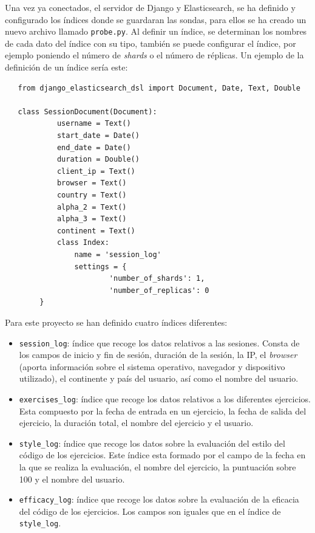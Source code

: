   Una vez ya conectados, el servidor de Django y Elasticsearch, se ha definido y configurado los índices donde se guardaran las sondas, para ellos se ha creado un nuevo archivo llamado \texttt{probe.py}. Al definir un índice, se determinan los nombres de cada dato del índice con su tipo, también se puede configurar el índice, por ejemplo poniendo el número de\textit{ shards }o el número de réplicas. Un ejemplo de la definición de un índice sería este: \\

\begin{lstlisting}
   from django_elasticsearch_dsl import Document, Date, Text, Double
   
   class SessionDocument(Document):
    		username = Text()
  	  		start_date = Date()
   			end_date = Date()
    		duration = Double()
    		client_ip = Text()
    		browser = Text()
    		country = Text()
    		alpha_2 = Text()
    		alpha_3 = Text()
    		continent = Text()
    		class Index:
        		name = 'session_log'
        		settings = {
            			'number_of_shards': 1,
           				'number_of_replicas': 0
        }
\end{lstlisting} 
 \newpage
Para este proyecto se han definido cuatro índices diferentes:

\begin{itemize}
\item \texttt{session\_log}: índice que recoge los datos relativos a las sesiones. Consta de los campos de inicio y fin de sesión, duración de la sesión, la IP, el \textit{browser} (aporta información sobre el sistema operativo, navegador y dispositivo utilizado), el continente y país del usuario, así como el nombre del usuario.
\item \texttt{exercises\_log}: índice que recoge los datos relativos a los diferentes ejercicios. Esta compuesto por la fecha de entrada en un ejercicio, la fecha de salida del ejercicio, la duración total, el nombre del ejercicio y el usuario.
\item \texttt{style\_log}: índice que recoge los datos sobre la evaluación del estilo del código de los ejercicios. Este índice esta formado por el campo de la fecha en la que se realiza la evaluación, el nombre del ejercicio, la puntuación sobre 100 y el nombre del usuario.
\item \texttt{efficacy\_log}: índice que recoge los datos sobre la evaluación de la eficacia del código de los ejercicios. Los campos son iguales que en el índice de \texttt{style\_log}.
\end{itemize}

